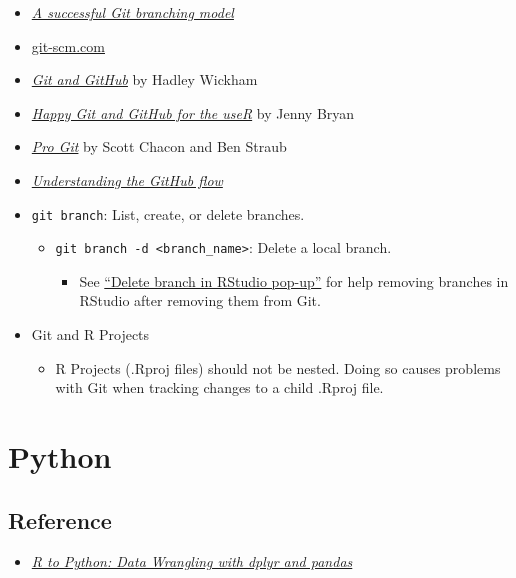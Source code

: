 \documentclass[
]{book}
\providecommand{\tightlist}{%
  \setlength{\itemsep}{0pt}\setlength{\parskip}{0pt}}
\begin{document}
\begin{itemize}
\tightlist
\item
  \href{https://nvie.com/posts/a-successful-git-branching-model/}{\emph{A successful Git branching model}}
\item
  \href{https://git-scm.com/}{git-scm.com}
\item
  \href{http://r-pkgs.had.co.nz/git.html\#git-learning}{\emph{Git and GitHub}} by Hadley Wickham
\item
  \href{http://happygitwithr.com/}{\emph{Happy Git and GitHub for the useR}} by Jenny Bryan
\item
  \href{https://git-scm.com/book/en/v2}{\emph{Pro Git}} by Scott Chacon and Ben Straub
\item
  \href{https://guides.github.com/introduction/flow/}{\emph{Understanding the GitHub flow}}
\item
  \texttt{git\ branch}: List, create, or delete branches.

  \begin{itemize}
  \tightlist
  \item
    \texttt{git\ branch\ -d\ \textless{}branch\_name\textgreater{}}: Delete a local branch.

    \begin{itemize}
    \tightlist
    \item
      See \href{https://community.rstudio.com/t/delete-branch-in-rstudio-pop-up/15465}{``Delete branch in RStudio pop-up''} for help removing branches in RStudio after removing them from Git.
    \end{itemize}
  \end{itemize}
\item
  Git and R Projects

  \begin{itemize}
  \tightlist
  \item
    R Projects (.Rproj files) should not be nested. Doing so causes problems with Git when tracking changes to a child .Rproj file.
  \end{itemize}
\end{itemize}

\hypertarget{python}{%
\chapter{Python}\label{python}}

\hypertarget{reference}{%
\section{Reference}\label{reference}}

\begin{itemize}
\tightlist
\item
  \href{https://gist.github.com/conormm/fd8b1980c28dd21cfaf6975c86c74d07}{\emph{R to Python: Data Wrangling with dplyr and pandas}}
\end{itemize}

  
\end{document}
